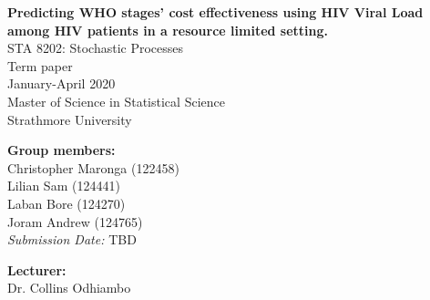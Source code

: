 \documentclass[11pt]{article}
\begin{document}
	\clearpage\thispagestyle{empty}
	
	\begin{center}
		\textbf{\huge{
				Predicting WHO stages' cost effectiveness using HIV Viral Load among HIV patients in a resource limited setting.
		}} \\[1.5cm]
		\Large{
			STA 8202: Stochastic Processes \\
			Term paper \\
			January-April 2020\\[0.5cm]
			Master of Science in Statistical Science\\
			Strathmore University	
		}
	\end{center}
	
	\vspace*{1cm}
	\textbf{\large{Group members:}}\\
	Christopher Maronga (122458) \\
	Lilian Sam (124441) \\
	Laban Bore (124270) \\
	Joram Andrew (124765) \\[0.5cm]
	
	\noindent\textit{Submission Date:} TBD
	
	\vspace*{2.5cm}
	\textbf{\large{Lecturer:}}\\
	Dr. Collins Odhiambo 
	
	
	\newpage \setcounter{page}{1}
	
\end{document}
